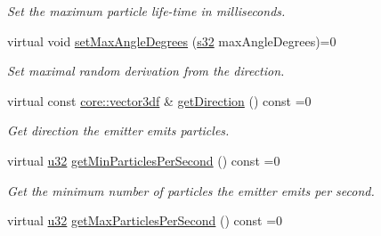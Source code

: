 \begin{DoxyCompactItemize}
\begin{DoxyCompactList}\small\item\em Set the maximum particle life-\/time in milliseconds. \end{DoxyCompactList}\item 
\mbox{\label{classirr_1_1scene_1_1IParticleEmitter_aa796cf949482b58f7821163d5f186acb}} 
virtual void \hyperlink{classirr_1_1scene_1_1IParticleEmitter_aa796cf949482b58f7821163d5f186acb}{set\+Max\+Angle\+Degrees} (\hyperlink{namespaceirr_ac66849b7a6ed16e30ebede579f9b47c6}{s32} max\+Angle\+Degrees)=0
\begin{DoxyCompactList}\small\item\em Set maximal random derivation from the direction. \end{DoxyCompactList}\item 
\mbox{\label{classirr_1_1scene_1_1IParticleEmitter_a832ac8c82a5e555b3c926b200aa2bd87}} 
virtual const \hyperlink{namespaceirr_1_1core_ae6e2b2a6c552833ebbd5b7463d03586b}{core\+::vector3df} \& \hyperlink{classirr_1_1scene_1_1IParticleEmitter_a832ac8c82a5e555b3c926b200aa2bd87}{get\+Direction} () const =0
\begin{DoxyCompactList}\small\item\em Get direction the emitter emits particles. \end{DoxyCompactList}\item 
\mbox{\label{classirr_1_1scene_1_1IParticleEmitter_a375f9a3b4d462e55d503a6db58a76717}} 
virtual \hyperlink{namespaceirr_a0416a53257075833e7002efd0a18e804}{u32} \hyperlink{classirr_1_1scene_1_1IParticleEmitter_a375f9a3b4d462e55d503a6db58a76717}{get\+Min\+Particles\+Per\+Second} () const =0
\begin{DoxyCompactList}\small\item\em Get the minimum number of particles the emitter emits per second. \end{DoxyCompactList}\item 
\mbox{\label{classirr_1_1scene_1_1IParticleEmitter_afd04037b5e4988e053d7d9bf17817cd7}} 
virtual \hyperlink{namespaceirr_a0416a53257075833e7002efd0a18e804}{u32} \hyperlink{classirr_1_1scene_1_1IParticleEmitter_afd04037b5e4988e053d7d9bf17817cd7}{get\+Max\+Particles\+Per\+Second} () const =0

\end{DoxyCompactItemize}

